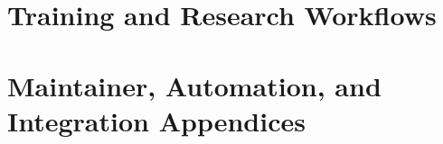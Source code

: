 \documentclass[11pt,a4paper]{report}
\begin{document}
\part{Training and Research Workflows}






\part{Maintainer, Automation, and Integration Appendices}





\appendix


\end{document}

